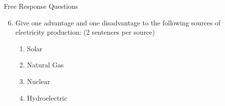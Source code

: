 \documentclass[11pt]{article}
\newcommand{\answer}[1]{\iftoggle{INCLUDEANSWERS}{{\color{violet!70!white}\textbf{Solution:} #1}}{} }
\newcommand{\points}[1]{\iftoggle{INCLUDEPOINTS}{{\color{blue!70!white}(#1 pts.)}}{}}
\begin{document}
\vspace*{5mm}
Free Response Questions

\begin{enumerate}
  \setcounter{enumi}{5}
  \item \points{20} Give one advantage and one disadvantage to the following sources of electricity production: (2 sentences per source)
  \begin{enumerate}  
    \item Solar
    \item Natural Gas
    \item Nuclear
    \item Hydroelectric
  \end{enumerate}

  \answer{
    \begin{enumerate}  
      \item Solar
      
      \begin{itemize}
        \item advantages: low-cost, clean and renewable
        \item disadvantages: only during the day and duck-curve
      \end{itemize}
      
      \item Natural Gas
      
      \begin{itemize}
       \item advantages: dispatchable and less dirty than natural gas
        \item disadvantages: CO2 and a bit more expensive
      \end{itemize}
      \item Nuclear
      
      \begin{itemize}
        \item advantages: Good at covering baseload generation and no-emissions
        \item disadvantages: Waste is hard to dispose of and a risky advantage b/c of public backlash
      \end{itemize}

      \item Hydroelectric
      
      \begin{itemize}
        \item advantages: free, dispatchable and clean
        \item disadvantages: limited geographic scope
      \end{itemize}
    \end{enumerate} 
  }


\end{enumerate}
\end{document}
